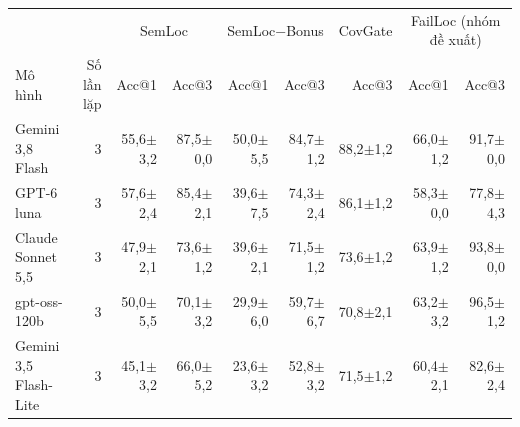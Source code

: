 \begin{tabular}{lrrrrrrrr}
\toprule
 & & \multicolumn{2}{c}{SemLoc} & \multicolumn{2}{c}{SemLoc−Bonus} & CovGate & \multicolumn{2}{c}{FailLoc (nhóm đề xuất)} \\
\cmidrule(lr){3-4}\cmidrule(lr){5-6}\cmidrule(lr){7-7}\cmidrule(lr){8-9}
Mô hình & Số lần lặp & Acc@1 & Acc@3 & Acc@1 & Acc@3 & Acc@3 & Acc@1 & Acc@3 \\
\midrule
Gemini 3,8 Flash & 3 & 55,6{\scriptsize$\pm$3,2} & 87,5{\scriptsize$\pm$0,0} & 50,0{\scriptsize$\pm$5,5} & 84,7{\scriptsize$\pm$1,2} & 88,2{\scriptsize$\pm$1,2} & 66,0{\scriptsize$\pm$1,2} & 91,7{\scriptsize$\pm$0,0} \\
GPT-6 luna & 3 & 57,6{\scriptsize$\pm$2,4} & 85,4{\scriptsize$\pm$2,1} & 39,6{\scriptsize$\pm$7,5} & 74,3{\scriptsize$\pm$2,4} & 86,1{\scriptsize$\pm$1,2} & 58,3{\scriptsize$\pm$0,0} & 77,8{\scriptsize$\pm$4,3} \\
Claude Sonnet 5,5 & 3 & 47,9{\scriptsize$\pm$2,1} & 73,6{\scriptsize$\pm$1,2} & 39,6{\scriptsize$\pm$2,1} & 71,5{\scriptsize$\pm$1,2} & 73,6{\scriptsize$\pm$1,2} & 63,9{\scriptsize$\pm$1,2} & 93,8{\scriptsize$\pm$0,0} \\
gpt-oss-120b & 3 & 50,0{\scriptsize$\pm$5,5} & 70,1{\scriptsize$\pm$3,2} & 29,9{\scriptsize$\pm$6,0} & 59,7{\scriptsize$\pm$6,7} & 70,8{\scriptsize$\pm$2,1} & 63,2{\scriptsize$\pm$3,2} & 96,5{\scriptsize$\pm$1,2} \\
Gemini 3,5 Flash-Lite & 3 & 45,1{\scriptsize$\pm$3,2} & 66,0{\scriptsize$\pm$5,2} & 23,6{\scriptsize$\pm$3,2} & 52,8{\scriptsize$\pm$3,2} & 71,5{\scriptsize$\pm$1,2} & 60,4{\scriptsize$\pm$2,1} & 82,6{\scriptsize$\pm$2,4} \\
\bottomrule
\end{tabular}
